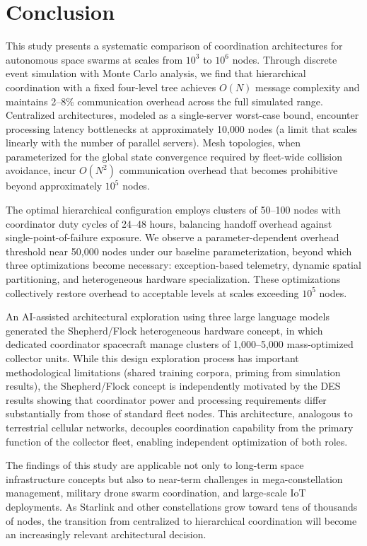 \documentclass[journal]{IEEEtran}
\begin{document}
\section{Conclusion}

This study presents a systematic comparison of coordination architectures for autonomous space swarms at scales from $10^3$ to $10^6$ nodes. Through discrete event simulation with Monte Carlo analysis, we find that hierarchical coordination with a fixed four-level tree achieves $O(N)$ message complexity and maintains 2--8\% communication overhead across the full simulated range. Centralized architectures, modeled as a single-server worst-case bound, encounter processing latency bottlenecks at approximately 10{,}000 nodes (a limit that scales linearly with the number of parallel servers). Mesh topologies, when parameterized for the global state convergence required by fleet-wide collision avoidance, incur $O(N^2)$ communication overhead that becomes prohibitive beyond approximately $10^5$ nodes.

The optimal hierarchical configuration employs clusters of 50--100 nodes with coordinator duty cycles of 24--48 hours, balancing handoff overhead against single-point-of-failure exposure. We observe a parameter-dependent overhead threshold near 50{,}000 nodes under our baseline parameterization, beyond which three optimizations become necessary: exception-based telemetry, dynamic spatial partitioning, and heterogeneous hardware specialization. These optimizations collectively restore overhead to acceptable levels at scales exceeding $10^5$ nodes.

An AI-assisted architectural exploration using three large language models generated the Shepherd/Flock heterogeneous hardware concept, in which dedicated coordinator spacecraft manage clusters of 1{,}000--5{,}000 mass-optimized collector units. While this design exploration process has important methodological limitations (shared training corpora, priming from simulation results), the Shepherd/Flock concept is independently motivated by the DES results showing that coordinator power and processing requirements differ substantially from those of standard fleet nodes. This architecture, analogous to terrestrial cellular networks, decouples coordination capability from the primary function of the collector fleet, enabling independent optimization of both roles.

The findings of this study are applicable not only to long-term space infrastructure concepts but also to near-term challenges in mega-constellation management, military drone swarm coordination, and large-scale IoT deployments. As Starlink and other constellations grow toward tens of thousands of nodes, the transition from centralized to hierarchical coordination will become an increasingly relevant architectural decision.
\end{document}
